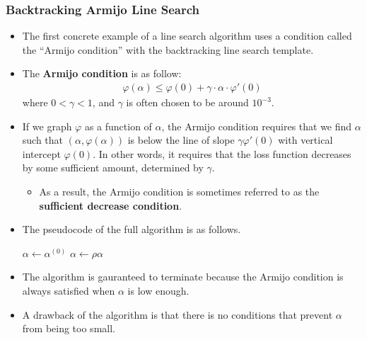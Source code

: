 \documentclass[10pt]{article}
\begin{document}
\subsubsection{Backtracking Armijo Line Search}

\begin{itemize}
    \item The first concrete example of a line search algorithm uses a condition called the ``Armijo condition'' \cite{Cao:2021} with the backtracking line search template.
    
    \item The {\bf Armijo condition} is as follow:
    \begin{align*}
        \varphi(\alpha) \leq \varphi(0) + \gamma \cdot \alpha \cdot \varphi'(0)
    \end{align*}
    where $0 < \gamma < 1$, and $\gamma$ is often chosen to be around $10^{-3}$.

    \item If we graph $\varphi$ as a function of $\alpha$, the Armijo condition requires that we find $\alpha$ such that $(\alpha, \varphi(\alpha))$ is below the line of slope $\gamma \varphi'(0)$ with vertical intercept $\varphi(0)$. In other words, it requires that the loss function decreases by some sufficient amount, determined by $\gamma$.
    \begin{itemize}
        \item As a result, the Armijo condition is sometimes referred to as the {\bf sufficient decrease condition}.        
    \end{itemize}

    \item The pseudocode of the full algorithm is as follows.
    \medskip
    \begin{algorithmic}
        \State $\alpha \gets \alpha^{(0)}$
            \State $\alpha \gets \rho \alpha$
        \EndWhile        
    \end{algorithmic}

    \item The algorithm is gauranteed to terminate because the Armijo condition is always satisfied when $\alpha$ is low enough.
    
    \item A drawback of the algorithm is that there is no conditions that prevent $\alpha$ from being too small.
\end{itemize}
\end{document}
